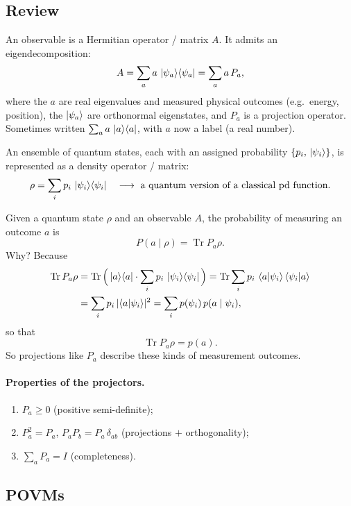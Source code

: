 \documentclass[11pt]{article}
\newcommand{\Tr}{\operatorname{Tr}}
\begin{document}
\subsection{Review}

An observable is a Hermitian operator / matrix $A$. It admits an
eigendecomposition:
\[
A = \sum_{a} a\,\ket{\psi_a}\!\bra{\psi_a}
  = \sum_{a} a\,P_a,
\]
where the $a$ are real eigenvalues and measured physical outcomes (e.g.\
energy, position), the $\ket{\psi_a}$ are orthonormal eigenstates, and $P_a$
is a projection operator. Sometimes written $\sum_a a\,\ket{a}\!\bra{a}$, with
$a$ now a label (a real number).

An ensemble of quantum states, each with an assigned probability
$\{p_i,\,\ket{\psi_i}\}$, is represented as a density operator / matrix:
\[
\rho = \sum_{i} p_i\,\ket{\psi_i}\!\bra{\psi_i}
\quad\longrightarrow\ \text{a quantum version of a classical pd function.}
\]

Given a quantum state $\rho$ and an observable $A$, the probability of
measuring an outcome $a$ is
\[
P(a\mid\rho) = \Tr P_a\rho.
\]
Why? Because
\begin{align*}
\Tr P_a\rho
&= \Tr\Big(\ket{a}\!\bra{a}\cdot\sum_i p_i\,\ket{\psi_i}\!\bra{\psi_i}\Big)
= \Tr\sum_i p_i\,\braket{a|\psi_i}\braket{\psi_i|a}\\
&= \sum_i p_i\,|\!\braket{a|\psi_i}\!|^{2}
= \sum_i p(\psi_i)\,p(a\mid\psi_i),
\end{align*}
so that
\[
\boxed{\;\Tr P_a\rho = p(a).\;}
\]
So projections like $P_a$ describe these kinds of measurement outcomes.

\paragraph{Properties of the projectors.}
\begin{enumerate}[label=(\arabic*), nosep]
  \item $P_a \ge 0$ \quad (positive semi-definite);
  \item $P_a^{2}=P_a$, \quad $P_a P_b = P_a\,\delta_{ab}$ \quad
        (projections $+$ orthogonality);
  \item $\displaystyle\sum_a P_a = I$ \quad (completeness).
\end{enumerate}

\subsection{POVMs}
\end{document}
